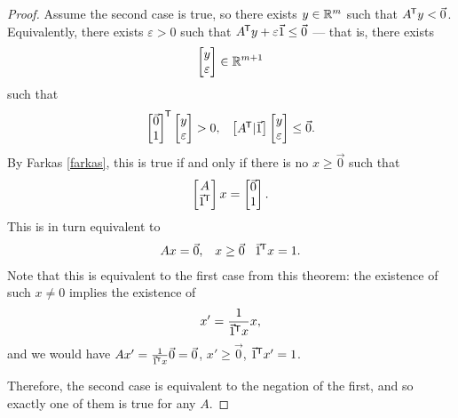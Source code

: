 \begin{proof}
    Assume the second case is true, so there exists $y \in \mathbb{R}^m$ such that $A^{\mkern-1.5mu\mathsf{T}}y < \vec{0}$. Equivalently, there exists $\varepsilon > 0$ such that $A^{\mkern-1.5mu\mathsf{T}}y + \varepsilon\vec{1} \leq \vec{0}$ --- that is, there exists
    \begin{align*}
        \begin{bmatrix}
            y \\ \varepsilon
        \end{bmatrix} \in \mathbb{R}^{m+1}
    \end{align*}
    such that
    \begin{align*}
        \begin{bmatrix}
            \vec{0} \\ 1
        \end{bmatrix}^{\mkern-1.5mu\mathsf{T}}
        \begin{bmatrix}
            y \\ \varepsilon
        \end{bmatrix} > 0,\;\;\;\begin{bmatrix}
            A^{\mkern-1.5mu\mathsf{T}} | \vec{1}
        \end{bmatrix}\begin{bmatrix}
            y \\ \varepsilon
        \end{bmatrix} \leq \vec{0}.
    \end{align*}
    By Farkas \ref{farkas}, this is true if and only if there is no $x \geq \vec{0}$ such that
    \begin{align*}
        \begin{bmatrix}
            A \\ \vec{1}^{\mkern-1.5mu\mathsf{T}}
        \end{bmatrix}x = \begin{bmatrix}
            \vec{0} \\ 1
        \end{bmatrix}.
    \end{align*}
    This is in turn equivalent to
    \begin{align*}
        Ax = \vec{0},\;\;\;x \geq \vec{0}\;\;\;\vec{1}^{\mkern-1.5mu\mathsf{T}}x = 1.
    \end{align*}
    Note that this is equivalent to the first case from this theorem: the existence of such $x \neq 0$ implies the existence of
    \begin{align*}
        x' = \frac{1}{\vec{1}^{\mkern-1.5mu\mathsf{T}}x}x,
    \end{align*}
    and we would have $Ax' = \frac{1}{\vec{1}^{\mkern-1.5mu\mathsf{T}}x}\vec{0} = \vec{0}$, $x' \geq \vec{0}$, $\vec{1}^{\mkern-1.5mu\mathsf{T}}x' = 1$.

    Therefore, the second case is equivalent to the negation of the first, and so exactly one of them is true for any $A$.
\end{proof}

